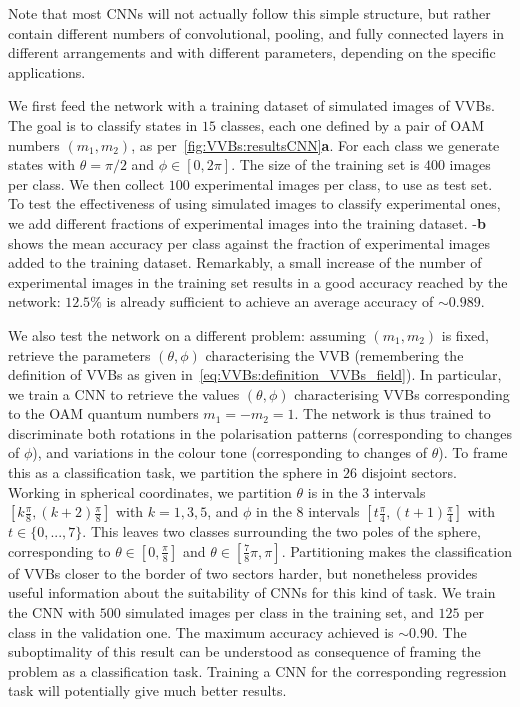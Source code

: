 Note that most CNNs will not actually follow this simple structure, but rather contain different numbers of convolutional, pooling, and fully connected layers in different arrangements and with different parameters, depending on the specific applications.

We first feed the network with a training dataset of simulated images of \acp{VVB}. The goal is to classify states in $15$ classes, each one defined by a pair of OAM numbers $(m_1,m_2)$, as per~\cref{fig:VVBs:resultsCNN}\textbf{a}.
For each class we generate states with $\theta=\pi/2$ and $\phi\in[0,2\pi]$. The size of the training set is $400$ images per class.
We then collect $100$ experimental images per class, to use as test set.
To test the effectiveness of using simulated images to classify experimental ones, we add different fractions of experimental images into the training dataset.
-{\bf b} shows the mean accuracy per class against the fraction of experimental images added to the training dataset.
Remarkably, a small increase of the number of experimental images in the training set results in a good accuracy reached by the network: $12.5\%$ is already sufficient to achieve an average accuracy of $\sim 0.989$.


We also test the network on a different problem: assuming $(m_1,m_2)$ is fixed, retrieve the parameters $(\theta,\phi)$ characterising the VVB (remembering the definition of VVBs as given in~\cref{eq:VVBs:definition_VVBs_field}).
In particular, we train a CNN to retrieve the values $(\theta,\phi)$ characterising VVBs corresponding to the OAM quantum numbers $m_1=-m_2=1$.
The network is thus trained to discriminate both rotations in the polarisation patterns (corresponding to changes of $\phi$), and variations in the colour tone (corresponding to changes of $\theta$).
To frame this as a classification task, we partition the sphere in $26$ disjoint sectors.
Working in spherical coordinates, we partition $\theta$ is in the $3$ intervals $\left[k \frac{\pi}{8}, (k+2) \frac{\pi}{8}\right]$ with $k=1,3,5$, and $\phi$ in the $8$ intervals $\left[t \frac{\pi}{4}, (t+1) \frac{\pi}{4}\right]$ with $t \in \{0,...,7\}$.
This leaves two classes surrounding the two poles of the sphere, corresponding to $\theta \in \left[0, \frac{\pi}{8}\right]$ and $\theta\in\left[ \frac{7}{8} \pi, \pi\right]$.
Partitioning makes the classification of VVBs closer to the border of two sectors harder, but nonetheless provides useful information about the suitability of CNNs for this kind of task.
We train the CNN with $500$ simulated images per class in the training set, and $125$ per class in the validation one. The maximum accuracy  achieved is $\sim 0.90$.
The suboptimality of this result can be understood as consequence of framing the problem as a classification task. Training a CNN for the corresponding regression task will potentially give much better results.

